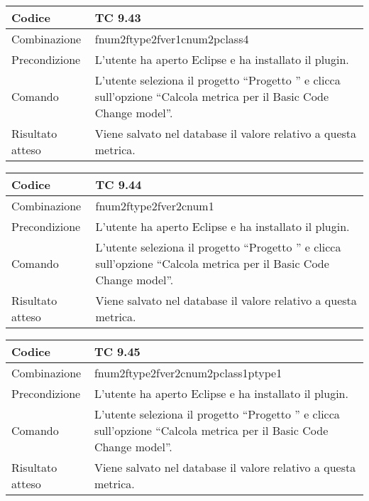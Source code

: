\clearpage

\begin{table}[ht]
\begin{tabular}{|p{3cm}|p{9cm}|}
\hline
\cellcolor{lightgray}Codice				& TC 9.43								\\
\hline
\cellcolor{lightgray}Combinazione		& fnum2ftype2fver1cnum2pclass4									\\
\hline
\cellcolor{lightgray}Precondizione		& L'utente ha aperto Eclipse e ha installato il plugin.		\\
\hline
\cellcolor{lightgray}Comando			& L'utente seleziona il progetto ``Progetto ''  e clicca sull'opzione ``Calcola metrica per il Basic Code Change model''.	\\
\hline
\cellcolor{lightgray}Risultato atteso	& Viene salvato nel database il valore relativo a questa metrica.\\
\hline
\end{tabular}
\end{table}

\begin{table}[ht]
\begin{tabular}{|p{3cm}|p{9cm}|}
\hline
\cellcolor{lightgray}Codice				& TC 9.44								\\
\hline
\cellcolor{lightgray}Combinazione		& fnum2ftype2fver2cnum1									\\
\hline
\cellcolor{lightgray}Precondizione		& L'utente ha aperto Eclipse e ha installato il plugin.		\\
\hline
\cellcolor{lightgray}Comando			& L'utente seleziona il progetto ``Progetto ''  e clicca sull'opzione ``Calcola metrica per il Basic Code Change model''.	\\
\hline
\cellcolor{lightgray}Risultato atteso	& Viene salvato nel database il valore relativo a questa metrica.\\
\hline
\end{tabular}
\end{table}

\begin{table}[ht]
\begin{tabular}{|p{3cm}|p{9cm}|}
\hline
\cellcolor{lightgray}Codice				& TC 9.45								\\
\hline
\cellcolor{lightgray}Combinazione		& fnum2ftype2fver2cnum2pclass1ptype1									\\
\hline
\cellcolor{lightgray}Precondizione		& L'utente ha aperto Eclipse e ha installato il plugin.		\\
\hline
\cellcolor{lightgray}Comando			& L'utente seleziona il progetto ``Progetto ''  e clicca sull'opzione ``Calcola metrica per il Basic Code Change model''.	\\
\hline
\cellcolor{lightgray}Risultato atteso	& Viene salvato nel database il valore relativo a questa metrica.\\
\hline
\end{tabular}
\end{table}

